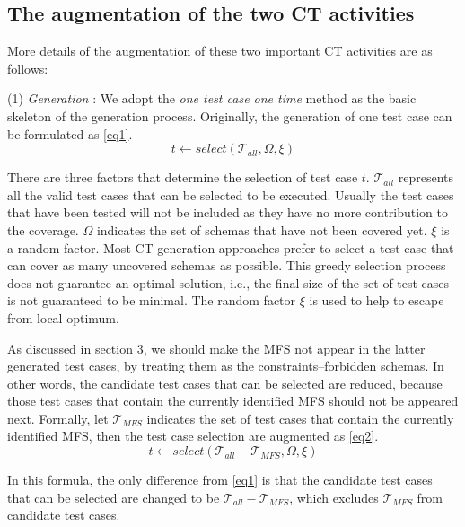 \documentclass{sig-alternate}
\begin{document}
\subsection{The augmentation of the two CT activities}
More details of the augmentation of these two important CT activities are as follows:

(1) \emph{Generation} :
We adopt the \emph{one test case one time} method as the basic skeleton of the generation process. Originally, the generation of one test case can be formulated as \ref{eq1}.
\begin{displaymath} t \leftarrow  select (\mathcal{T}_{all}, \Omega ,  \xi) \tag{EQ1} \label{eq1} \end{displaymath}

There are three factors that determine the selection of test case $t$. $\mathcal{T}_{all}$ represents all the valid test cases that can be selected to be executed. Usually the test cases that have been tested will not be included as they have no more contribution to the coverage. $\Omega$ indicates the set of schemas that have not been covered yet. $\xi$ is a random factor. Most CT generation approaches prefer to select a test case that can cover as many uncovered schemas as possible. This greedy selection process does not guarantee an optimal solution, i.e., the final size of the set of test cases is not guaranteed to be minimal. The random factor $\xi$ is used to help to escape from local optimum.



As discussed in section 3, we should make the MFS not appear in the latter generated test cases, by treating them as the constraints--forbidden schemas. In other words, the candidate test cases that can be selected are reduced, because those test cases that contain the currently identified MFS should not be appeared next. Formally,  let $\mathcal{T}_{MFS}$ indicates the set of test cases that contain the currently identified MFS, then the test case selection are augmented as \ref{eq2}.
\begin{displaymath} t \leftarrow  select (\mathcal{T}_{all} - \mathcal{T}_{MFS}, \Omega ,  \xi ) \tag{EQ2} \label{eq2} \end{displaymath}

In this formula, the only difference from \ref{eq1} is that the candidate test cases that can be selected are changed to be $\mathcal{T}_{all} - \mathcal{T}_{MFS}$, which excludes $\mathcal{T}_{MFS}$ from candidate test cases.
\end{document}
